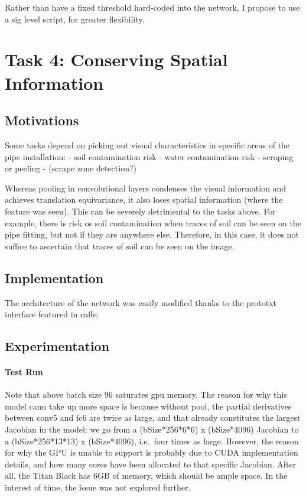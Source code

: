 \documentclass[a4paper,11pt]{article}
\begin{document}
Rather than have a fixed threshold hard-coded into the network, I propose to use a sig level script, for greater flexibility. \\


\section{Task 4: Conserving Spatial Information}

\subsection{Motivations}

Some tasks depend on picking out visual characteristics in specific areas of the pipe installation:
- soil contamination risk
- water contamination risk
- scraping or peeling
- (scrape zone detection?)

Whereas pooling in convolutional layers condenses the visual information and achieves translation equivariance, it also loses spatial information (where the feature was seen). This can be severely detrimental to the tasks above. For example, there is risk os soil contamination when traces of soil can be seen on the pipe fitting, but not if they are anywhere else. Therefore, in this case, it does not suffice to ascertain that traces of soil can be seen on the image. \\

\subsection{Implementation}

The architecture of the network was easily modified thanks to the prototxt interface featured in caffe. 

\subsection{Experimentation}

\paragraph{Test Run}

Note that above batch size 96 saturates gpu memory. The reason for why this model cann take up more space is because without pool, the partial derivatives between conv5 and fc6 are twice as large, and that already constitutes the largest Jacobian in the model: we go from a (bSize*256*6*6) x (bSize*4096) Jacobian to a (bSize*256*13*13) x (bSize*4096), i.e.\ four times as large. However, the reason for why the GPU is unable to support is probably due to CUDA implementation details, and how many cores have been allocated to that specific Jacobian. After all, the Titan Black has 6GB of memory, which should be ample space. In the interest of time, the issue was not explored further. \\
     
\end{document}
